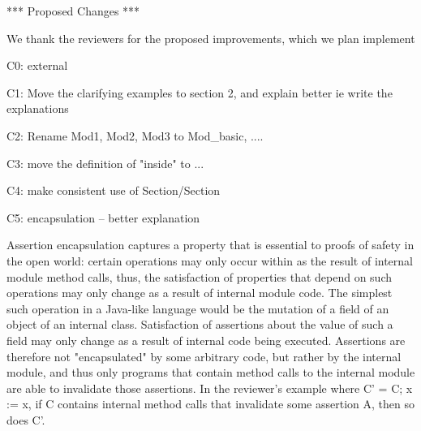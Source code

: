
 

*** Proposed Changes ***

We thank the reviewers for the proposed improvements, which we plan implement

C0: external

C1: Move the clarifying examples to section 2, and explain better
ie write the explanations

C2: Rename Mod1, Mod2, Mod3 to Mod_{basic}, ....

C3: move the definition of "inside" to ...

C4: make consistent use of Section/Section

C5: encapsulation -- better explanation

Assertion encapsulation captures a property that is essential to proofs of safety in the open world: certain operations may only occur within as the result of internal module method calls, thus, the satisfaction of properties that depend on such operations may only change as a result of internal module code. The simplest such operation in a Java-like language would be the mutation of a field of an object of an internal class. Satisfaction of assertions about the value of such a field may only change as a result of internal code being executed. Assertions are therefore not "encapsulated" by some arbitrary code, but rather by the internal module, and thus only programs that contain method calls to the internal module are able to invalidate those assertions. In the reviewer's example where C' = C; x := x, if C contains internal method calls that invalidate some assertion A, then so does C'.
 
